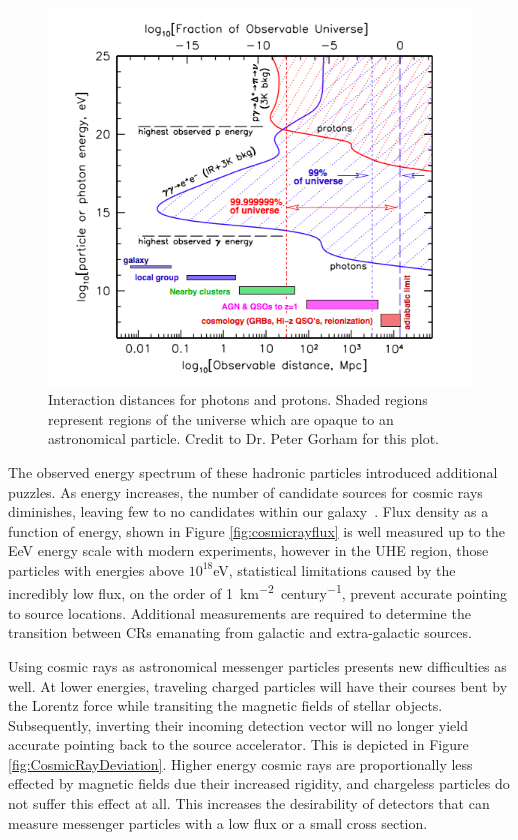 \begin{figure}
\centering
	\includegraphics[width=\textwidth]{figures/ObservableUniverse}
	\caption{Interaction distances for photons and protons.  Shaded regions represent regions of the universe which are opaque to an astronomical particle. Credit to Dr. Peter Gorham for this plot.}
\label{fig:observableUniverse}
\end{figure}
	
	The observed energy spectrum of these hadronic particles introduced additional puzzles. As energy increases, the number of candidate sources for cosmic rays diminishes, leaving few to no candidates within our galaxy~\cite{RevModPhys.71.S33}.  Flux density as a function of energy, shown in Figure \ref{fig:cosmicrayflux} is well measured up to the EeV energy scale with modern experiments, however in the UHE region, those particles with energies above $10^{18}$eV, statistical limitations caused by the incredibly low flux, on the order of \SI{1}{\km^{-2} century^{-1}}, prevent accurate pointing to source locations.  Additional measurements are required to determine the transition between CRs emanating from galactic and extra-galactic sources.

	Using cosmic rays as astronomical messenger particles presents new difficulties as well.  At lower energies, traveling charged particles will have their courses bent by the Lorentz force while transiting the magnetic fields of stellar objects. Subsequently, inverting their incoming detection vector will no longer yield accurate pointing back to the source accelerator.  This is depicted in Figure \ref{fig:CosmicRayDeviation}.  Higher energy cosmic rays are proportionally less effected by magnetic fields due their increased rigidity, and chargeless particles do not suffer this effect at all.  This increases the desirability of detectors that can measure messenger particles with a low flux or a small cross section.
	

